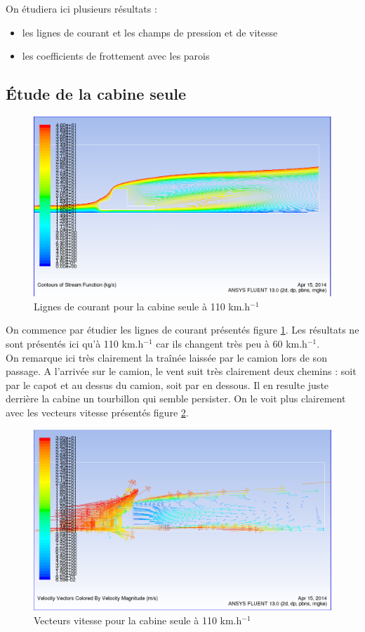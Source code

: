 \bigskip
On étudiera ici plusieurs résultats :
\begin{itemize}
	\item les lignes de courant et les champs de pression et de vitesse
	\item les coefficients de frottement avec les parois
\end{itemize}

\subsection{Étude de la cabine seule}
\begin{figure}[!h]
\centering
\includegraphics[scale=0.4]{resultsCx/camion110_stream.png}
\caption{Lignes de courant pour la cabine seule à 110 km.h$^{-1}$}
\label{figCabStream110}
\end{figure}
On commence par étudier les lignes de courant présentés figure \ref{figCabStream110}. Les résultats ne sont présentés ici qu'à 110 km.h$^{-1}$ car ils changent très peu à 60 km.h$^{-1}$. \\
On remarque ici très clairement la traînée laissée par le camion lors de son passage. A l'arrivée sur le camion, le vent suit très clairement deux chemins : soit par le capot et au dessus du camion, soit par en dessous. Il en resulte juste derrière la cabine un tourbillon qui semble persister. On le voit plus clairement avec les vecteurs vitesse présentés figure \ref{figCabVit110}.

\begin{figure}[!h]
\centering
\includegraphics[scale=0.4]{resultsCx/camion110_velocityVectors.png}
\caption{Vecteurs vitesse pour la cabine seule à 110 km.h$^{-1}$}
\label{figCabVit110}
\end{figure}
\clearpage

